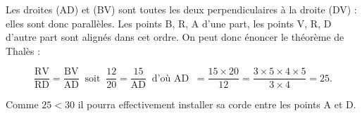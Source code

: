 
\medskip

%
%
%
%
%
%
%
%
%
%
Les droites (AD) et (BV) sont toutes les deux perpendiculaires à la droite (DV) : elles sont donc parallèles. Les points B, R, A d'une part, les points V, R, D d'autre part sont alignés dans cet ordre. On peut donc énoncer le théorème de Thalès :

\[\dfrac{\text{RV}}{\text{RD}} = \dfrac{\text{BV}}{\text{AD}} \:\text{ soit }\: \dfrac{12}{20} = \dfrac{15}{\text{AD}}\: \text{ d'où  AD }\: = \dfrac{15 \times 20}{12} = \dfrac{3 \times 5 \times 4 \times 5}{3 \times 4} = 25.\]

Comme $25 < 30$ il pourra effectivement installer sa corde entre les points A et D.
